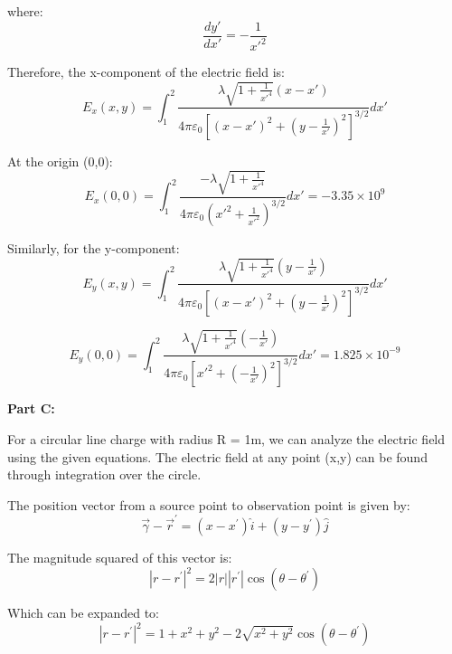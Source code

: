 \documentclass[14pt]{article}
\begin{document}
where:
\begin{equation}
\frac{dy'}{dx'} = -\frac{1}{x'^2}
\end{equation}

Therefore, the x-component of the electric field is:
\begin{equation}
E_x(x,y) = \int_1^2 \frac{\lambda\sqrt{1 + \frac{1}{x'^4}}(x-x')}{4\pi\varepsilon_0[(x-x')^2 + (y-\frac{1}{x'})^2]^{3/2}} dx'
\end{equation}

At the origin (0,0):
\begin{equation}
E_x(0,0) = \int_1^2 \frac{-\lambda\sqrt{1 + \frac{1}{x'^4}}}{4\pi\varepsilon_0(x'^2 + \frac{1}{x'^2})^{3/2}} dx' = -3.35 \times 10^9
\end{equation}

Similarly, for the y-component:
\begin{equation}
E_y(x,y) = \int_1^2 \frac{\lambda\sqrt{1 + \frac{1}{x'^4}}(y-\frac{1}{x'})}{4\pi\varepsilon_0[(x-x')^2 + (y-\frac{1}{x'})^2]^{3/2}} dx'
\end{equation}

\begin{equation}
    E_y(0,0) = \int_1^2 \frac{\lambda\sqrt{1 + \frac{1}{x'^4}}(-\frac{1}{x'})}{4\pi\varepsilon_0[x'^2 + (-\frac{1}{x'})^2]^{3/2}} dx' = 1.825 \times 10^{-9} 
\end{equation}

\noindent\textbf{Part C:}

For a circular line charge with radius R = 1m, we can analyze the electric field using the given equations. The electric field at any point (x,y) can be found through integration over the circle.

The position vector from a source point to observation point is given by:
\begin{equation}
\vec{\gamma}-\vec{r}^{\prime}=\left(x-x^{\prime}\right) \hat{i}+\left(y-y^{\prime}\right) \hat{j}
\end{equation}

The magnitude squared of this vector is:
\begin{equation}
\left|r-r^{\prime}\right|^2=2|r|\left|r^{\prime}\right| \cos \left(\theta-\theta^{\prime}\right)
\end{equation}

Which can be expanded to:
\begin{equation}
\left|r-r^{\prime}\right|^2=1+x^2+y^2-2 \sqrt{x^2+y^2} \cos \left(\theta-\theta^{\prime}\right)
\end{equation}
\end{document}
